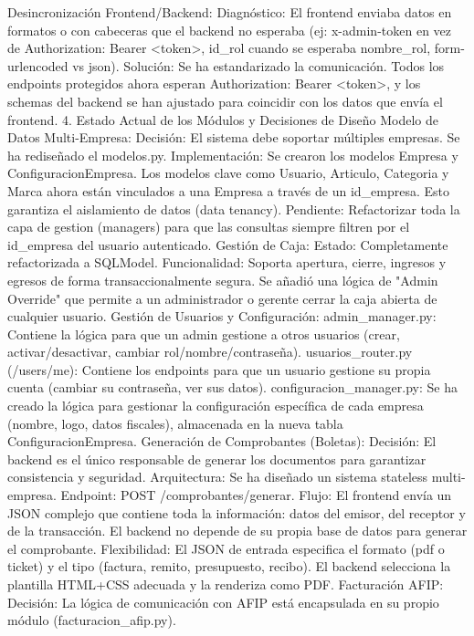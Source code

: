 Desincronización Frontend/Backend:
Diagnóstico: El frontend enviaba datos en formatos o con cabeceras que el backend no esperaba (ej: x-admin-token en vez de Authorization: Bearer <token>, id_rol cuando se esperaba nombre_rol, form-urlencoded vs json).
Solución: Se ha estandarizado la comunicación. Todos los endpoints protegidos ahora esperan Authorization: Bearer <token>, y los schemas del backend se han ajustado para coincidir con los datos que envía el frontend.
4. Estado Actual de los Módulos y Decisiones de Diseño
Modelo de Datos Multi-Empresa:
Decisión: El sistema debe soportar múltiples empresas. Se ha rediseñado el modelos.py.
Implementación: Se crearon los modelos Empresa y ConfiguracionEmpresa. Los modelos clave como Usuario, Articulo, Categoria y Marca ahora están vinculados a una Empresa a través de un id_empresa. Esto garantiza el aislamiento de datos (data tenancy).
Pendiente: Refactorizar toda la capa de gestion (managers) para que las consultas siempre filtren por el id_empresa del usuario autenticado.
Gestión de Caja:
Estado: Completamente refactorizada a SQLModel.
Funcionalidad: Soporta apertura, cierre, ingresos y egresos de forma transaccionalmente segura. Se añadió una lógica de "Admin Override" que permite a un administrador o gerente cerrar la caja abierta de cualquier usuario.
Gestión de Usuarios y Configuración:
admin_manager.py: Contiene la lógica para que un admin gestione a otros usuarios (crear, activar/desactivar, cambiar rol/nombre/contraseña).
usuarios_router.py (/users/me): Contiene los endpoints para que un usuario gestione su propia cuenta (cambiar su contraseña, ver sus datos).
configuracion_manager.py: Se ha creado la lógica para gestionar la configuración específica de cada empresa (nombre, logo, datos fiscales), almacenada en la nueva tabla ConfiguracionEmpresa.
Generación de Comprobantes (Boletas):
Decisión: El backend es el único responsable de generar los documentos para garantizar consistencia y seguridad.
Arquitectura: Se ha diseñado un sistema stateless multi-empresa.
Endpoint: POST /comprobantes/generar.
Flujo: El frontend envía un JSON complejo que contiene toda la información: datos del emisor, del receptor y de la transacción. El backend no depende de su propia base de datos para generar el comprobante.
Flexibilidad: El JSON de entrada especifica el formato (pdf o ticket) y el tipo (factura, remito, presupuesto, recibo). El backend selecciona la plantilla HTML+CSS adecuada y la renderiza como PDF.
Facturación AFIP:
Decisión: La lógica de comunicación con AFIP está encapsulada en su propio módulo (facturacion_afip.py).
